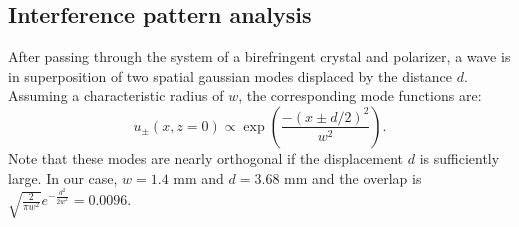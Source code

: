 \documentclass[prl,reprint,twocolumn,amsmath,preprintnumbers,amssymb,superscriptaddress]{revtex4-1}
\newcommand{\figref}[1]{Fig.~\ref{#1}}
\begin{document}
%
%

\subsection{Interference pattern analysis}

After passing through the system of a birefringent crystal and polarizer, a wave is in superposition of two spatial gaussian modes displaced by the distance $d$. Assuming a characteristic radius of $w$, the corresponding mode functions are:
\begin{equation}
u_\pm(x,z=0) \propto \exp\left(\frac{-(x\pm d/2)^2}{w^2}\right).
\label{eq:basis}
\end{equation}
Note that these modes are nearly orthogonal if the displacement $d$ is sufficiently large. In our case, $w=1.4$ mm and $d=3.68$ mm and the overlap is ${ \sqrt{\frac{2}{\pi w^2}}e^{-\frac{d^2}{2 w^2}}}=0.0096$. 
\end{document}
